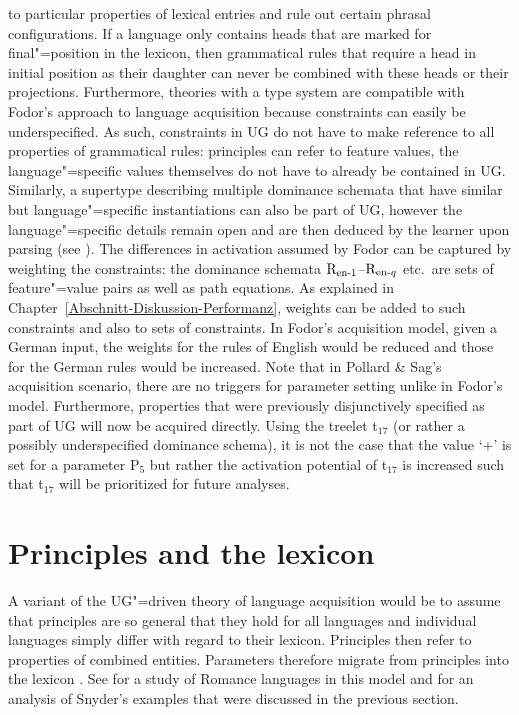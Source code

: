 to particular properties of lexical entries and rule out certain phrasal configurations.
If a language only contains heads that are marked for final"=position in the lexicon, then grammatical rules that
require a head in initial position as their daughter can never be combined with these heads or their projections.
Furthermore, theories with a type system are compatible with Fodor's approach to language acquisition because 
constraints can easily be underspecified. As such, constraints in UG do not have to make reference to all properties
of grammatical rules: principles can refer to feature values, the language"=specific values themselves do not have to
already be contained in UG. Similarly, a supertype describing multiple dominance schemata that have
similar but language"=specific instantiations can also be part of UG, however the language"=specific details remain open and are then deduced by the learner
upon parsing (see \citealp[Section~9.2]{AW98a}). The differences in activation assumed by Fodor can be captured
by weighting the constraints: the dominance schemata $\mathrm{R}_{\mathrm{en}\text{\normalfont -}1}$--$\mathrm{R}_{\mathrm{en}\text{\normalfont -} q}$ etc.\ are sets of
feature"=value pairs as well as path equations. As explained in Chapter~\ref{Abschnitt-Diskussion-Performanz}, 
weights can be added to such constraints and also to sets of constraints. In Fodor's acquisition model, given a German input, the weights for the rules
of English would be reduced and those for the German rules would be increased. Note that in Pollard
\& Sag's acquisition scenario, there are no triggers for parameter
setting unlike in Fodor's model.
Furthermore, properties that were previously disjunctively specified as part of UG will now be
acquired directly. Using the treelet t$_{17}$ (or rather a possibly underspecified dominance
schema), it is not the case that the value `+' is set for a parameter P$_5$  but rather the activation
potential of t$_{17}$ is increased such that t$_{17}$ will be prioritized for future
analyses.


\section{Principles and the lexicon}

A variant of the UG"=driven theory of language acquisition would be to assume that principles are so general that they hold
for all languages and individual languages simply differ with regard to their lexicon.
Principles then refer to properties of combined entities. Parameters therefore migrate from principles into the lexicon
\citep[]{Chomsky99a}. See \citet{MR2010a} for a study of Romance languages in this model and
\citet[]{SonS2008a} for an analysis of Snyder's examples that were discussed in the
previous section.

